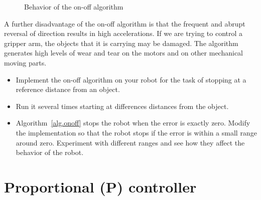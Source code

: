\begin{figure}
\begin{center}
\caption{Behavior of the on-off algorithm}\label{fig.onoff}
\end{center}
\end{figure}

A further disadvantage of the on-off algorithm is that the frequent and abrupt reversal of direction results in high accelerations. If we are trying to control a gripper arm, the objects that it is carrying may be damaged. The algorithm generates high levels of wear and tear on the motors and on other mechanical moving parts.

\begin{framed}
\begin{itemize}
\item Implement the on-off algorithm on your robot for the task of stopping at a reference distance from an object.
\item Run it several times starting at differences distances from the object.
\item Algorithm~\ref{alg.onoff} stops the robot when the error is exactly zero. Modify the implementation so that the robot stops if the error is within a small range around zero. Experiment with different ranges and see how they affect the behavior of the robot.
\end{itemize}
\end{framed}

\section{Proportional (P) controller}\label{s.p}

